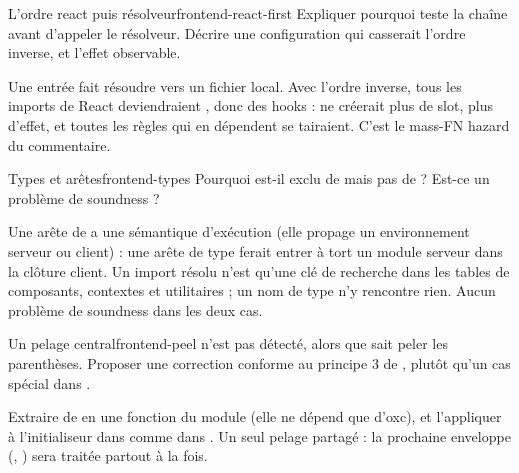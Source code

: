 \begin{exercice}{L'ordre \og react\fg{} puis résolveur}{frontend-react-first}
Expliquer pourquoi  teste la chaîne  avant d'appeler le résolveur. Décrire une configuration  qui casserait l'ordre inverse, et l'effet observable.
\end{exercice}
\begin{solution}
Une entrée  fait résoudre  vers un fichier local. Avec l'ordre inverse, tous les imports de React deviendraient , donc des hooks  :  ne créerait plus de slot,  plus d'effet, et toutes les règles qui en dépendent se tairaient. C'est le \og mass-FN hazard\fg{} du commentaire.
\end{solution}

\begin{exercice}{Types et arêtes}{frontend-types}
Pourquoi  est-il exclu de  mais pas de  ? Est-ce un problème de soundness ?
\end{exercice}
\begin{solution}
Une arête de  a une sémantique d'exécution (elle propage un environnement serveur ou client) : une arête de type ferait entrer à tort un module serveur dans la clôture client. Un import résolu n'est qu'une clé de recherche dans les tables de composants, contextes et utilitaires ; un nom de type n'y rencontre rien. Aucun problème de soundness dans les deux cas.
\end{solution}

\begin{exercice}{Un pelage central}{frontend-peel}
 n'est pas détecté, alors que  sait peler les parenthèses. Proposer une correction conforme au principe 3 de , plutôt qu'un cas spécial dans .
\end{exercice}
\begin{solution}
Extraire  de  en une fonction du module  (elle ne dépend que d'oxc), et l'appliquer à l'initialiseur dans  comme dans . Un seul pelage partagé : la prochaine enveloppe (, ) sera traitée partout à la fois.
\end{solution}

